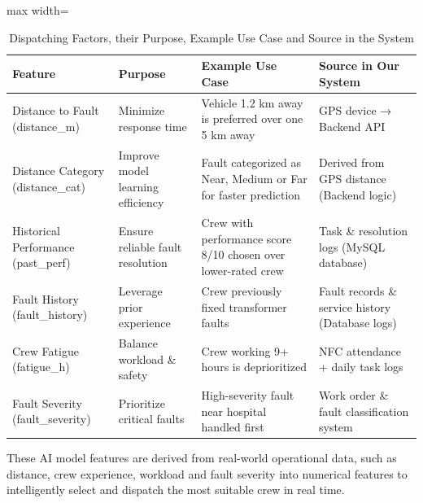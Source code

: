 \begin{table}[H]  %
    \centering
    \caption{Dispatching Factors, their Purpose, Example Use Case and Source in the System}
    \label{tab:6.2}
    \vspace{1em}  %
    \small  %
    \begin{adjustbox}{max width=\textwidth}  %
        \begin{tabular}{>{\raggedright\arraybackslash}p{3.8cm}>{\raggedright\arraybackslash}p{3.8cm}>{\raggedright\arraybackslash}p{3.8cm}>{\raggedright\arraybackslash}p{3.8cm}}
            \toprule
            \textbf{Feature} & \textbf{Purpose} & \textbf{Example Use Case} & \textbf{Source in Our System} \\
            \midrule
            Distance to Fault (distance\_m) & Minimize response time & Vehicle 1.2 km away is preferred over one 5 km away & GPS device → Backend API \\
            Distance Category (distance\_cat) & Improve model learning efficiency & Fault categorized as Near, Medium or Far for faster prediction & Derived from GPS distance (Backend logic) \\
            Historical Performance (past\_perf) & Ensure reliable fault resolution & Crew with performance score 8/10 chosen over lower-rated crew & Task \& resolution logs (MySQL database) \\
            Fault History (fault\_history) & Leverage prior experience & Crew previously fixed transformer faults & Fault records \& service history (Database logs) \\
            Crew Fatigue (fatigue\_h) & Balance workload \& safety & Crew working 9+ hours is deprioritized & NFC attendance + daily task logs \\
            Fault Severity (fault\_severity) & Prioritize critical faults & High-severity fault near hospital handled first & Work order \& fault classification system \\
            \bottomrule
        \end{tabular}
    \end{adjustbox}
\end{table}

These AI model features are derived from real-world operational data, such as distance, crew experience, workload and fault severity into numerical features to intelligently select and dispatch the most suitable crew in real time.

